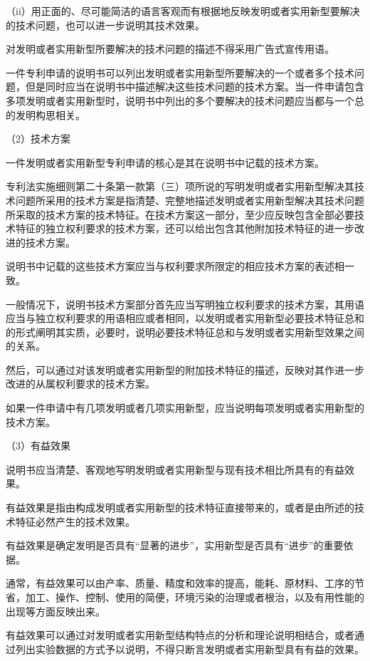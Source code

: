 {\setlength{\parindent}{17.1bp}（ii）用正面的、尽可能简洁的语言客观而有根据地反映发明或者实用新型要解决的技术问题，也可以进一步说明其技术效果。\par}

对发明或者实用新型所要解决的技术问题的描述不得采用广告式宣传用语。

一件专利申请的说明书可以列出发明或者实用新型所要解决的一个或者多个技术问题，但是同时应当在说明书中描述解决这些技术问题的技术方案。当一件申请包含多项发明或者实用新型时，说明书中列出的多个要解决的技术问题应当都与一个总的发明构思相关。

{\setlength{\parindent}{17.1bp}（2）技术方案\par}

一件发明或者实用新型专利申请的核心是其在说明书中记载的技术方案。

专利法实施细则第二十条第一款第（三）项所说的写明发明或者实用新型解决其技术问题所采用的技术方案是指清楚、完整地描述发明或者实用新型解决其技术问题所采取的技术方案的技术特征。在技术方案这一部分，至少应反映包含全部必要技术特征的独立权利要求的技术方案，还可以给出包含其他附加技术特征的进一步改进的技术方案。

说明书中记载的这些技术方案应当与权利要求所限定的相应技术方案的表述相一致。

一般情况下，说明书技术方案部分首先应当写明独立权利要求的技术方案，其用语应当与独立权利要求的用语相应或者相同，以发明或者实用新型必要技术特征总和的形式阐明其实质，必要时，说明必要技术特征总和与发明或者实用新型效果之间的关系。

然后，可以通过对该发明或者实用新型的附加技术特征的描述，反映对其作进一步改进的从属权利要求的技术方案。

如果一件申请中有几项发明或者几项实用新型，应当说明每项发明或者实用新型的技术方案。

{\setlength{\parindent}{17.1bp}（3）有益效果\par}

说明书应当清楚、客观地写明发明或者实用新型与现有技术相比所具有的有益效果。

有益效果是指由构成发明或者实用新型的技术特征直接带来的，或者是由所述的技术特征必然产生的技术效果。

有益效果是确定发明是否具有“显著的进步”，实用新型是否具有“进步”的重要依据。

通常，有益效果可以由产率、质量、精度和效率的提高，能耗、原材料、工序的节省，加工、操作、控制、使用的简便，环境污染的治理或者根治，以及有用性能的出现等方面反映出来。

有益效果可以通过对发明或者实用新型结构特点的分析和理论说明相结合，或者通过列出实验数据的方式予以说明，不得只断言发明或者实用新型具有有益的效果。

